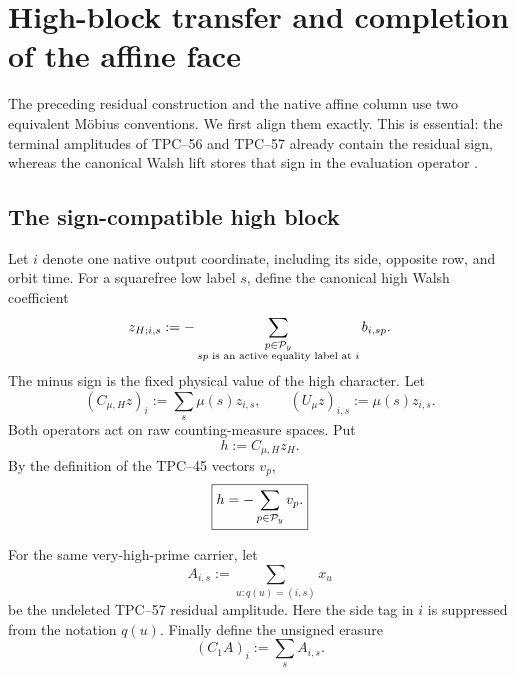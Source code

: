 \section{High-block transfer and completion of the affine face}
\label{sec:tpc58-affine-completion}

The preceding residual construction and the native affine column use two
equivalent M\"obius conventions.  We first align them exactly.  This is
essential: the terminal amplitudes of TPC--56 and TPC--57 already contain
the residual sign, whereas the canonical Walsh lift stores that sign in the
evaluation operator \citep{WangTPC45,WangTPC56,WangTPC57}.

\subsection{The sign-compatible high block}

Let \(i\) denote one native output coordinate, including its side, opposite
row, and orbit time.  For a squarefree low label \(s\), define the canonical
high Walsh coefficient
\begin{equation}
 z_{H;i,s}
 :=-
 \sum_{\substack{p\in\mathcal P_y\\sp\text{ is an active equality label at }i}}
 b_{i,sp}.
 \label{eq:tpc58-canonical-high-coefficient}
\end{equation}
The minus sign is the fixed physical value of the high character.  Let
\begin{equation}
 (C_{\mu,H}z)_i
 :=\sum_s\mu(s)z_{i,s},
 \qquad
 (U_\mu z)_{i,s}:=\mu(s)z_{i,s}.
 \label{eq:tpc58-high-erasure-and-gauge}
\end{equation}
Both operators act on raw counting-measure spaces.  Put
\begin{equation}
 h:=C_{\mu,H}z_H.
 \label{eq:tpc58-native-high-vector}
\end{equation}
By the definition of the TPC--45 vectors \(v_p\),
\begin{equation}
 \boxed{
 h=-\sum_{p\in\mathcal P_y}v_p.}
 \label{eq:tpc58-high-vector-vp}
\end{equation}

For the same very-high-prime carrier, let
\begin{equation}
 A_{i,s}
 :=\sum_{u:q(u)=(i,s)}x_u
 \label{eq:tpc58-tpc57-residual-amplitude}
\end{equation}
be the undeleted TPC--57 residual amplitude.  Here the side tag in \(i\)
is suppressed from the notation \(q(u)\).  Finally define the unsigned
erasure
\begin{equation}
 (C_1A)_i:=\sum_sA_{i,s}.
 \label{eq:tpc58-unsigned-erasure}
\end{equation}

